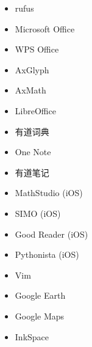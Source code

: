 \begin{itemize}
\item rufus
\item Microsoft Office
\item WPS Office
\item AxGlyph
\item AxMath
\item LibreOffice
\item 有道词典
\item One Note
\item 有道笔记
\item MathStudio (iOS)
\item SIMO (iOS)
\item Good Reader (iOS)
\item Pythonista (iOS)
\item Vim
\item Google Earth
\item Google Maps
\item InkSpace
\end{itemize}

